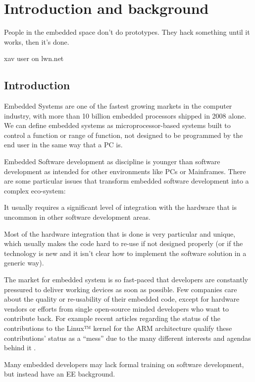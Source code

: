 \chapter{Introduction and background}
\epigraph{People in the embedded space don't do prototypes. They hack something until it works, then it's done.}{xav user on lwn.net}

\section{Introduction}
Embedded Systems are one of the fastest growing markets in the computer industry, with more than 10 billion embedded processors shipped in 2008 alone\citep{Clarke:2009uq}. We can define embedded systems as microprocessor-based systems built to control a function or range of function, not designed to be programmed by the end user in the same way that a \ac{PC} is\cite{heath2003embedded}.

Embedded Software development as discipline is younger than software development as intended for other environments like \acp{PC} or Mainframes. There are some particular issues that transform embedded software development into a complex eco-system:
\begin{itemize*}
\item It usually requires a significant level of integration with the hardware that is uncommon in other software development areas.
\item Most of the hardware integration that is done is very particular and unique, which usually makes the code hard to re-use if not designed properly (or if the technology is new and it isn't clear how to implement the software solution in a generic way).
\item The market for embedded system is so fast-paced that developers are constantly pressured to deliver working devices as soon as possible. Few companies care about the quality or re-usability of their embedded code, except for hardware vendors or efforts from single open-source minded developers who want to contribute back. For example recent articles regarding the status of the contributions to the Linux™ kernel for the \ac{ARM} architecture qualify these contributions' status as a  ``mess'' due to the many different interests and agendas behind it \cite{Proffitt:2011fk}.
\item Many embedded developers may lack formal training on software development, but instead have an \ac{EE} background.
\end{itemize*}

